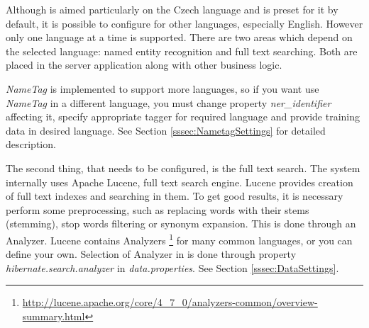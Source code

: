
Although \textan{} is aimed particularly on the Czech language and is preset for
it by default, it is possible to configure \textan{} for other languages,
especially English. However only one language at a time is supported. There are
two areas which depend on the selected language: named entity recognition and full
text searching. Both are placed in the server application along with other
business logic.

{\it NameTag} is implemented to support more languages, so if you want use {\it
NameTag} in a different language, you must change property {\it ner\_identifier}
affecting it, specify appropriate tagger for required language and provide
training data in desired language. See Section \ref{sssec:NametagSettings} for
detailed description.

The second thing, that needs to be configured, is the full text search. The system
internally uses Apache Lucene, full text search engine. Lucene provides creation
of full text indexes and searching in them. To get good results, it is necessary
perform some preprocessing, such as replacing words with their stems (stemming),
stop words filtering or synonym expansion. This is done through an Analyzer.
Lucene contains Analyzers%
\footnote{\url{http://lucene.apache.org/core/4_7_0/analyzers-common/overview-summary.html}}
for many common languages, or you can define your own. Selection of Analyzer in 
\textan{} is done through property \emph{hibernate.search.analyzer} in
\emph{data.properties}. See Section \ref{sssec:DataSettings}.
